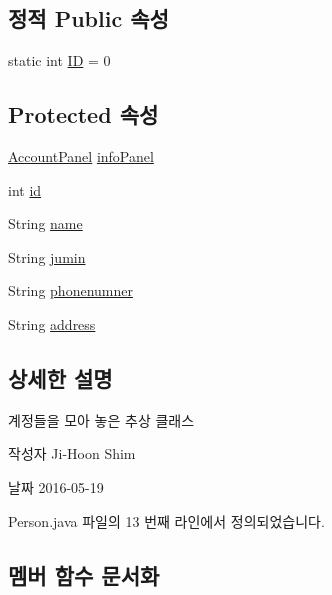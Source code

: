 \subsection*{정적 Public 속성}
\begin{DoxyCompactItemize}
\item 
static int \hyperlink{classpkg_1_1_person_af93c4dddd917c1fd77adc3eb68af3e54}{ID} = 0
\end{DoxyCompactItemize}
\subsection*{Protected 속성}
\begin{DoxyCompactItemize}
\item 
\hyperlink{classpkg_1_1_account_panel}{Account\+Panel} \hyperlink{classpkg_1_1_person_a4a1890f00be07d1bc4e3e9df16425210}{info\+Panel}
\item 
int \hyperlink{classpkg_1_1_person_acd3bca96258af32adc1eca89b74222a6}{id}
\item 
String \hyperlink{classpkg_1_1_person_a37fd1fe3cf039df98ffca54df6002bb6}{name}
\item 
String \hyperlink{classpkg_1_1_person_aef72766ac67a0af8074b513d00c523f8}{jumin}
\item 
String \hyperlink{classpkg_1_1_person_aa7a67349f91a08a8cc45067354653c1d}{phonenumner}
\item 
String \hyperlink{classpkg_1_1_person_a692aadebf7edf808fbcbacbcaed07ef3}{address}
\end{DoxyCompactItemize}


\subsection{상세한 설명}
계정들을 모아 놓은 추상 클래스 

\begin{DoxyAuthor}{작성자}
Ji-\/\+Hoon Shim 
\end{DoxyAuthor}
\begin{DoxyDate}{날짜}
2016-\/05-\/19 
\end{DoxyDate}


Person.\+java 파일의 13 번째 라인에서 정의되었습니다.



\subsection{멤버 함수 문서화}
